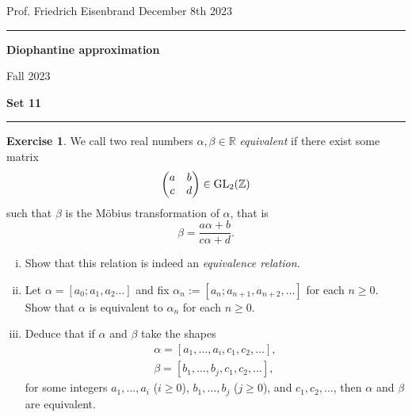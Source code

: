 \documentclass[12pt,a4paper]{article}
\date{}
\theoremstyle{plain}
\newtheorem*{Sol*}{Solution}
\theoremstyle{definition}
\newtheorem{Ex}{Exercise}
\def \R {\mathbb R}
\def \Z {\mathbb Z}
\newif\ifsolutions
\newcommand{\exercise}[2]{
			\begin{Ex} #1 \end{Ex}
			\ifsolutions  \begin{Sol*} #2 \end{Sol*} \bigskip \else \bigskip  \fi
		}
\begin{document}
\begin{center}
{Prof. Friedrich Eisenbrand \hfill December 8th 2023}
\end{center}
	
\hrule\vspace{\baselineskip}

\begin{center}
\textbf{Diophantine approximation}

Fall 2023

\bigskip

\textbf{Set 11}
\ifsolutions{\textbf{- Solutions}} \else{} \fi
\end{center}

\hrule\vspace{\baselineskip}





\exercise{
	We call two real numbers $\alpha, \beta \in \R$ \emph{equivalent} if there exist some matrix
		\[ \begin{pmatrix} a & b \\ c & d \end{pmatrix} \in {\rm GL}_2(\Z) \]
	such that $\beta$ is the Möbius transformation of $\alpha$, that is
		\[ \beta = \frac{a \alpha + b}{c \alpha + d}. \]
	
	\begin{enumerate}[i)]
		\item Show that this relation is indeed an \emph{equivalence relation}.
		\item Let $\alpha = [a_0;a_1, a_2 \dots]$ and fix $\alpha_n := [a_n; a_{n+1}, a_{n+2}, \dots]$ for each $n \geq 0$.
		Show that $\alpha$ is equivalent to $\alpha_n$ for each $n \geq 0$.

		\item Deduce that if $\alpha$ and $\beta$ take the shapes
			\begin{gather*}
				\alpha = [a_1, \dots, a_i, c_1, c_2, \dots], \\
				\beta = [b_1, \dots, b_j, c_1, c_2, \dots],
			\end{gather*}
		for some integers $a_1, \dots, a_i$ ($i \geq 0$), $b_1, \dots, b_j$ ($j\geq0$), and $c_1, c_2, \dots$,
		then $\alpha$ and $\beta$ are equivalent.
	\end{enumerate}
}
{}
\end{document}
